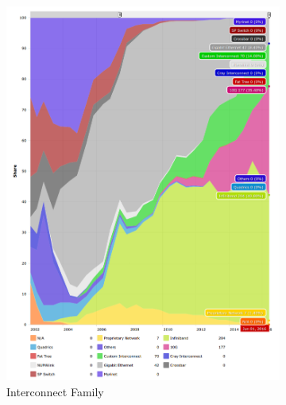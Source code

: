 \begin{figure}
\centering
\begin{subfigure}{.5\textwidth}
  \centering
  \includegraphics[width=1\linewidth]{images/top500-interconnect.png}
  \caption{Interconnect Family}
  \label{fig:sub1}
\end{subfigure}%
\begin{subfigure}{.5\textwidth}
  \centering

\end{subfigure}
\end{figure}
